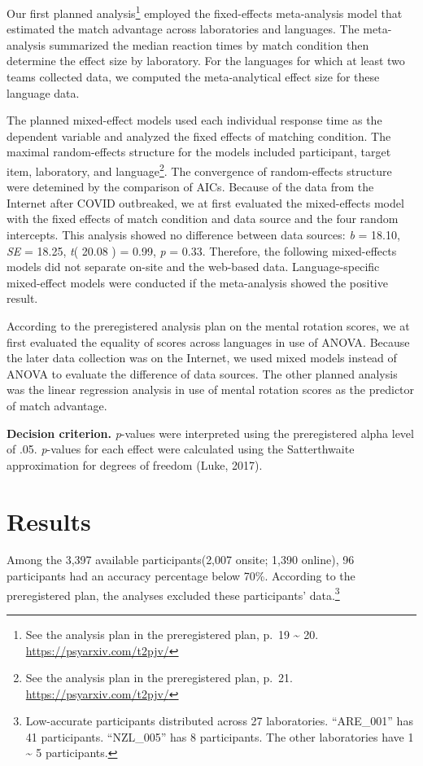 \documentclass[
  man,floatsintext]{apa6}
\begin{document}
Our first planned analysis\footnote{See the analysis plan in the preregistered plan, p.~19 \textasciitilde{} 20. \url{https://psyarxiv.com/t2pjv/}} employed the fixed-effects meta-analysis model that estimated the match advantage across laboratories and languages. The meta-analysis summarized the median reaction times by match condition then determine the effect size by laboratory. For the languages for which at least two teams collected data, we computed the meta-analytical effect size for these language data.

The planned mixed-effect models used each individual response time as the dependent variable and analyzed the fixed effects of matching condition. The maximal random-effects structure for the models included participant, target item, laboratory, and language\footnote{See the analysis plan in the preregistered plan, p.~21. \url{https://psyarxiv.com/t2pjv/}}. The convergence of random-effects structure were detemined by the comparison of AICs. Because of the data from the Internet after COVID outbreaked, we at first evaluated the mixed-effects model with the fixed effects of match condition and data source and the four random intercepts. This analysis showed no difference between data sources: \emph{b} = 18.10, \emph{SE} = 18.25, \emph{t}( 20.08 ) = 0.99, \emph{p} = 0.33. Therefore, the following mixed-effects models did not separate on-site and the web-based data. Language-specific mixed-effect models were conducted if the meta-analysis showed the positive result.

According to the preregistered analysis plan on the mental rotation scores, we at first evaluated the equality of scores across languages in use of ANOVA. Because the later data collection was on the Internet, we used mixed models instead of ANOVA to evaluate the difference of data sources. The other planned analysis was the linear regression analysis in use of mental rotation scores as the predictor of match advantage.

\textbf{Decision criterion.} \emph{p}-values were interpreted using the preregistered alpha level of .05. \emph{p}-values for each effect were calculated using the Satterthwaite approximation for degrees of freedom (Luke, 2017).

\hypertarget{results}{%
\section{Results}\label{results}}

Among the 3,397 available participants(2,007 onsite; 1,390 online), 96 participants had an accuracy percentage below 70\%. According to the preregistered plan, the analyses excluded these participants' data.\footnote{Low-accurate participants distributed across 27 laboratories. ``ARE\_001'' has 41 participants. ``NZL\_005'' has 8 participants. The other laboratories have 1 \textasciitilde{} 5 participants.}
\end{document}
